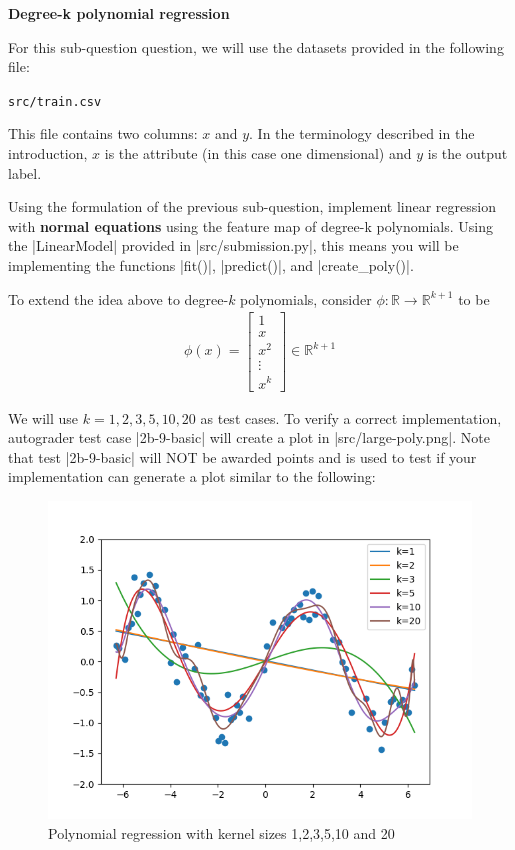 \item {} {\bf Degree-k polynomial regression}


For this sub-question question, we will use the datasets provided in
the following file:
%
\begin{center}
	\texttt{src/train.csv}
\end{center}
%

This file contains two columns: $x$ and $y$. In the terminology described in the introduction, $x$ is the attribute (in this case one dimensional) and $y$ is the output label.

Using the formulation of the previous sub-question, implement linear regression with \textbf{normal equations} using the feature map of degree-k polynomials. Using the |LinearModel| provided in |src/submission.py|, this means you will be implementing the functions |fit()|, |predict()|, and |create_poly()|.  

To extend the idea above to degree-$k$ polynomials, consider $\phi:\mathbb{R}\rightarrow \mathbb{R}^{k+1}$ to be 
		\begin{align}
	\phi(x) = \left[\begin{array}{c} 1\\ x \\ x^2\\ \vdots \\x^k \end{array}\right]\in \mathbb{R}^{k+1} \label{eqn:feature-k}
	\end{align}

We will use $k=1,2,3,5,10,20$ as test cases. To verify a correct implementation, autograder test case |2b-9-basic| will create a plot in |src/large-poly.png|.  Note that test |2b-9-basic| will NOT be awarded points and is used to test if your implementation can generate a plot similar to the following:

\begin{figure}[H]
  \centering
  \includegraphics[width=0.65\linewidth]{02-featuremaps/large-poly.png}
  \centering
\caption{Polynomial regression with kernel sizes 1,2,3,5,10 and 20}
\end{figure}